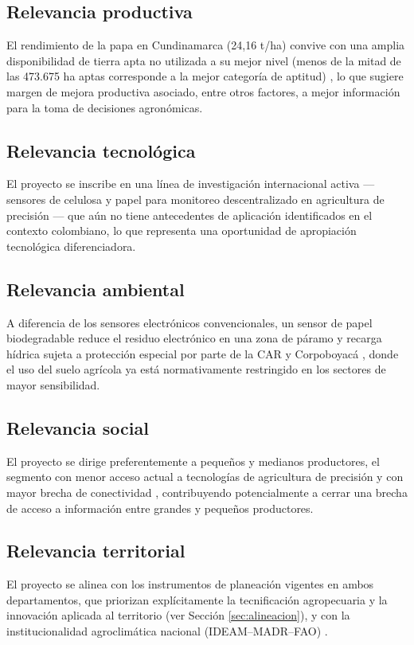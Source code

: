 \documentclass[11pt,a4paper]{article}
\begin{document}
\subsection{Relevancia productiva}
El rendimiento de la papa en Cundinamarca (24{,}16 t/ha) convive con una amplia disponibilidad de tierra apta no utilizada a su mejor nivel (menos de la mitad de las 473.675 ha aptas corresponde a la mejor categoría de aptitud) \citep{fedepapa_cundinamarca2023}, lo que sugiere margen de mejora productiva asociado, entre otros factores, a mejor información para la toma de decisiones agronómicas.

\subsection{Relevancia tecnológica}
El proyecto se inscribe en una línea de investigación internacional activa --- sensores de celulosa y papel para monitoreo descentralizado en agricultura de precisión \citep{nature2026cellulose,ieee2023biodeg,sciencedirect2025paper,sciencedirect2024review} --- que aún no tiene antecedentes de aplicación identificados en el contexto colombiano, lo que representa una oportunidad de apropiación tecnológica diferenciadora.

\subsection{Relevancia ambiental}
A diferencia de los sensores electrónicos convencionales, un sensor de papel biodegradable reduce el residuo electrónico en una zona de páramo y recarga hídrica sujeta a protección especial por parte de la CAR y Corpoboyacá \citep{corpoboyaca_paramo,corpoboyaca_car_paramo}, donde el uso del suelo agrícola ya está normativamente restringido en los sectores de mayor sensibilidad.

\subsection{Relevancia social}
El proyecto se dirige preferentemente a pequeños y medianos productores, el segmento con menor acceso actual a tecnologías de agricultura de precisión y con mayor brecha de conectividad \citep{mintic2023,scielo2022precision}, contribuyendo potencialmente a cerrar una brecha de acceso a información entre grandes y pequeños productores.

\subsection{Relevancia territorial}
El proyecto se alinea con los instrumentos de planeación vigentes en ambos departamentos, que priorizan explícitamente la tecnificación agropecuaria y la innovación aplicada al territorio (ver Sección \ref{sec:alineacion}), y con la institucionalidad agroclimática nacional (IDEAM--MADR--FAO) \citep{ideam_ban}.
\end{document}
